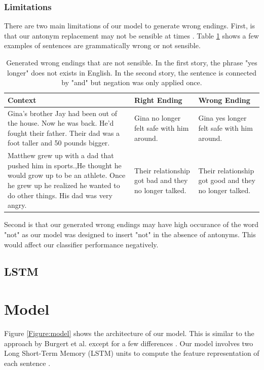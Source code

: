 \documentclass{article}
\begin{document}
\subsubsection{Limitations}
There are two main limitations of our model to generate wrong endings. First, is that our antonym replacement may not be sensible at times \citep{wordnet}. Table \ref{Tab:strange} shows a few examples of sentences are grammatically wrong or not sensible.

\begin{table}[h]\footnotesize
  \centering
  \begin{tabular}{ p{6cm} p{3cm} p{3cm} }
    \toprule
    Context & Right Ending & Wrong Ending \\
    \midrule
    Gina's brother Jay had been out of the house. Now he was back. He'd fought their father. Their dad was a foot taller and 50 pounds bigger. & Gina no longer felt safe with him around. & Gina yes longer felt safe with him around.\\
    \hline
    Matthew grew up with a dad that pushed him in sports.,He thought he would grow up to be an athlete. Once he grew up he realized he wanted to do other things. His dad was very angry. & Their relationship got bad and they no longer talked. & Their relationship got good and they no longer talked. \\
  \bottomrule

  \end{tabular}
  \label{Tab:strange}
  \caption{Generated wrong endings that are not sensible. In the first story, the phrase "yes longer" does not exists in English. In the second story, the sentence is connected by "and" but negation was only applied once.}
\end{table}

Second is that our generated wrong endings may have high occurance of the word "not" as our model was designed to insert "not" in the absence of antonyms. This would affect our classifier performance negatively.

\subsection{LSTM}


\section{Model}

Figure \ref{Figure:model} shows the architecture of our model. This is similar to the approach by Burgert et al. except for a few differences \cite{top4}. Our model involves two Long Short-Term Memory (LSTM) units to compute the feature representation of each sentence \citep{lstm}.
\end{document}
